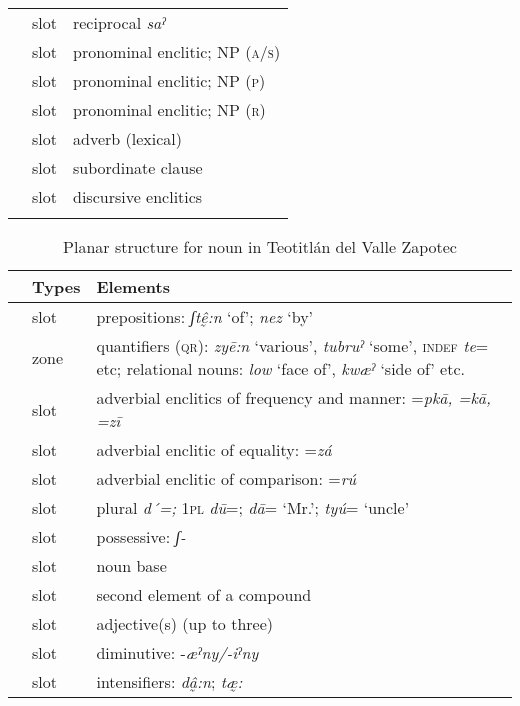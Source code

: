 \documentclass[output=paper]{langscibook}
\begin{document}
\begin{table}[p]
\begin{tabular}{Slp{9cm}}
\label{zrec22} & slot & reciprocal \textit{saˀ}\\
\label{zpron23} & slot & pronominal enclitic; NP (\textsc{a/s})\\
\label{zpron24} & slot & pronominal enclitic; NP (\textsc{p})\\
\label{zpron25} & slot & pronominal enclitic; NP (\textsc{r})\\
\label{zadv26} & slot & adverb (lexical)\\
\label{zsub27} & slot & subordinate clause \\
\label{zdisc28} & slot & discursive enclitics\\
    \lspbottomrule
    \end{tabular}
\end{table}

\begin{table}[p]
    \caption{Planar structure for noun in Teotitlán del Valle Zapotec}
    \label{tab:planarnzap}
    \begin{tabular}{Tlp{9cm}}
    \lsptoprule
{} & Types & Elements\\ \midrule
\label{znpp1} & slot & prepositions: \textit{ʃtḛ̂:n} `of'; \textit{nez} `by'\\
\label{znqnt2} & zone & quantifiers (\textsc{qr}): \textit{zyē:n} `various', \textit{tubruˀ} `some', \textsc{indef} \textit{te}= etc; relational nouns: \textit{low} `face of', \textit{kwæˀ} `side of' etc.\\
\label{znadv3} & slot & adverbial enclitics of frequency and manner: =\textit{pkā, =kā, =zī}\\
\label{znadv4} & slot & adverbial enclitic of equality: =\textit{zá}\\
\label{znadv5} & slot & adverbial enclitic of comparison: =\textit{rú}\\
\label{znpl6} & slot & plural \textit{d´=;} 1\textsc{pl} \textit{dū}=; \textit{dā}= `Mr.'; \textit{tyú}= `uncle'\\
\label{znpos7} & slot & possessive: \textit{ʃ{}-}\\
\label{znbase8} & slot & noun base\\
\label{zncom9} & slot & second element of a compound\\
\label{znadj10} & slot & adjective(s) (up to three)\\
\label{zndim11} & slot & diminutive: -\textit{æˀny/-iˀny}\\
\label{znint12} & slot & intensifiers: \textit{ dâ̰:n}; \textit{tæ̰:}\\

\end{tabular}
\end{table}
\end{document}
